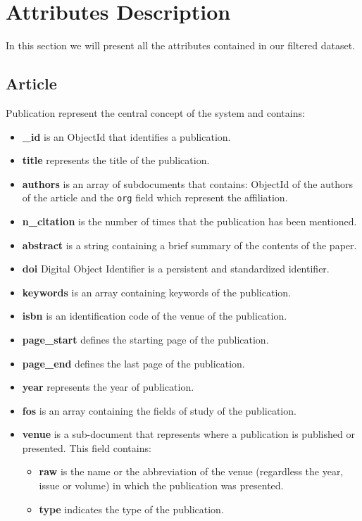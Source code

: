 \documentclass{Configuration_Files/PoliMi3i_thesis}
\begin{document}
\newpage
\section{Attributes Description}
In this section we will present all the attributes contained in our filtered dataset.

\subsection{Article}
Publication represent the central concept of the system and contains:
\begin{itemize}
\item \textbf{\_id} is an ObjectId that identifies a publication.
\item \textbf{title} represents the title of the publication.
\item \textbf{authors} is an array of subdocuments that contains: ObjectId of the authors of the article and the \verb |org|
	field which represent the affiliation.
\item \textbf{n\_citation} is the number of times that the publication has been mentioned.
\item \textbf{abstract} is a string containing a brief summary of the contents of the paper.
\item \textbf{doi} Digital Object Identifier is a persistent and standardized identifier.
\item \textbf{keywords} is an array containing keywords of the publication.
\item \textbf{isbn} is an identification code of the venue of the publication.
\item \textbf{page\_start} defines the starting page of the publication.
\item \textbf{page\_end} defines the last page of the publication.
\item \textbf{year} represents the year of publication.
\item \textbf{fos} is an array containing the fields of study of the publication.
\item \textbf{venue} is a sub-document that represents where a publication is published or presented. This field contains:
				\begin{itemize}
					\item \textbf{raw} is the name or the abbreviation of the venue (regardless the year, issue or volume) in which the
						publication was presented.
					\item \textbf{type} indicates the type of the publication.

\end{itemize}
\end{itemize}
\end{document}
